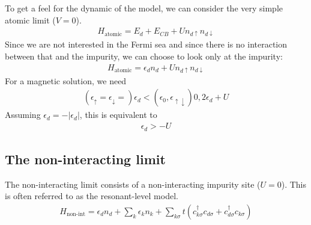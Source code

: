 \documentclass[twoside,11pt]{report}
\numberwithin{equation}{section}
\begin{document}
To get a feel for the dynamic of the model, we can consider the very simple atomic limit (\(V = 0\)).
\begin{equation}\begin{aligned}
H_\text{atomic} = E_d + E_{CB} + U n_{d\uparrow}n_{d\downarrow}
\end{aligned}\end{equation}
Since we are not interested in the Fermi sea and since there is no interaction between that and the impurity, we can choose to look only at the impurity:
\begin{equation}\begin{aligned}
H_\text{atomic} = \epsilon_d n_d + U n_{d\uparrow}n_{d\downarrow}
\end{aligned}\end{equation}
For a magnetic solution, we need
\begin{equation}\begin{aligned}
(\epsilon_\uparrow = \epsilon_\downarrow =)\epsilon_d < (\epsilon_0,\epsilon_{\uparrow\downarrow}) 0,2\epsilon_d + U
\end{aligned}\end{equation}
Assuming \(\epsilon_d = -|\epsilon_d|\), this is equivalent to
\begin{equation}\begin{aligned}
\epsilon_d > -U
\end{aligned}\end{equation}

\subsection{The non-interacting limit}
The non-interacting limit consists of a non-interacting impurity site (\(U = 0\)). This is often referred to as the resonant-level model.
\begin{equation}\begin{aligned}
	H_\text{non-int} = \epsilon_d n_d + \sum_k \epsilon_k n_k + \sum_{k\sigma} t\left(c^\dagger_{k\sigma}c_{d\sigma}+c^\dagger_{d\sigma}c_{k\sigma}\right)
\end{aligned}\end{equation}
\end{document}
